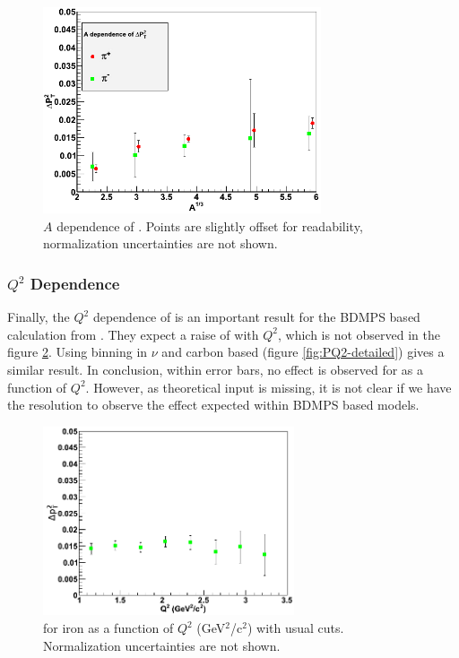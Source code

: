 \begin{figure}[tbp]
\centering
\includegraphics[width=8.2cm] {chap6-fig/F_PvA.png} 
\caption {$A$ dependence of \dptp. Points are slightly offset for readability, normalization uncertainties are not shown.}
\label{fig:PA}
\end{figure}

\subsubsection{$Q^2$ Dependence}

Finally, the $Q^2$ dependence of \dpt is an important result for the BDMPS based 
calculation from \cite{Domdey:2008aq}. They expect a raise of \dpt with $Q^2$,
which is not observed in the figure \ref{fig:PQ2}. Using
binning in $\nu$ and carbon based \dpt (figure \ref{fig:PQ2-detailed}) gives a similar
result. In conclusion, within error bars, no effect is observed for \dpt as a function of $Q^2$.
However, as theoretical input is missing, it is not clear if we have the resolution to observe
the effect expected within BDMPS based models.

\begin{figure}[tbp]
\centering
\includegraphics[width=7.4cm] {chap6-fig/F_PvQ2.png} 
\caption {\dpt for iron as a function of $Q^2$ (GeV$^2$/c$^2$) 
with usual cuts. Normalization uncertainties are not shown.}
\label{fig:PQ2}
\end{figure}

